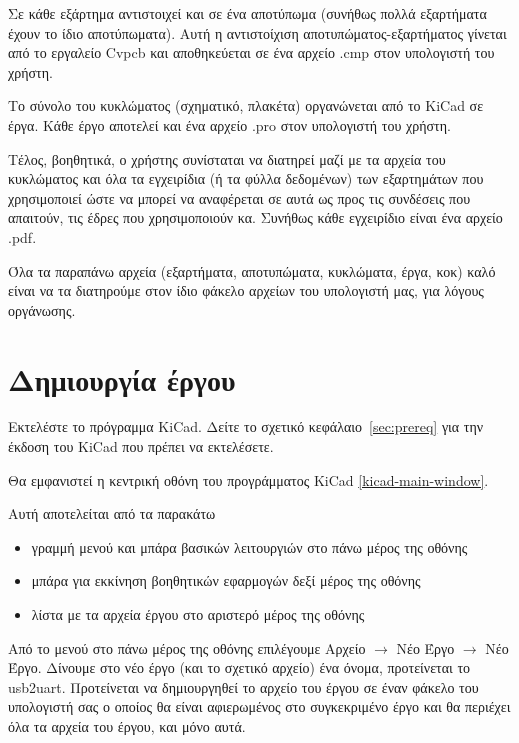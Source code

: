 \documentclass[a4paper]{article}
\begin{document}
Σε κάθε εξάρτημα αντιστοιχεί και σε ένα αποτύπωμα (συνήθως πολλά εξαρτήματα έχουν το ίδιο αποτύπωματα). Αυτή η αντιστοίχιση αποτυπώματος-εξαρτήματος γίνεται από το εργαλείο \textenglish{Cvpcb} και αποθηκεύεται σε ένα αρχείο .cmp στον υπολογιστή του χρήστη. 

Το σύνολο του κυκλώματος (σχηματικό, πλακέτα) οργανώνεται από το \textenglish{KiCad} σε έργα. Κάθε έργο αποτελεί και ένα αρχείο .pro στον υπολογιστή του χρήστη. 

Τέλος, βοηθητικά, ο χρήστης συνίσταται να διατηρεί μαζί με τα αρχεία του κυκλώματος και όλα τα εγχειρίδια (ή τα φύλλα δεδομένων) των εξαρτημάτων που χρησιμοποιεί ώστε να μπορεί να αναφέρεται σε αυτά ως προς τις συνδέσεις που απαιτούν, τις έδρες που χρησιμοποιούν κα. Συνήθως κάθε εγχειρίδιο είναι ένα αρχείο .pdf.

Όλα τα παραπάνω αρχεία (εξαρτήματα, αποτυπώματα, κυκλώματα, έργα, κοκ) καλό είναι να τα διατηρούμε στον ίδιο φάκελο αρχείων του υπολογιστή μας, για λόγους οργάνωσης.  
    
\section{Δημιουργία έργου}
Εκτελέστε το πρόγραμμα \textenglish{KiCad}. Δείτε το σχετικό κεφάλαιο~\ref{sec:prereq} για την έκδοση του \textenglish{KiCad} που πρέπει να εκτελέσετε.

Θα εμφανιστεί η κεντρική οθόνη του προγράμματος \textenglish{KiCad} \ref{kicad-main-window}. 

Αυτή αποτελείται από τα παρακάτω
\begin{itemize}
    \item γραμμή μενού και μπάρα βασικών λειτουργιών στο πάνω μέρος της οθόνης
    \item μπάρα για εκκίνηση βοηθητικών εφαρμογών δεξί μέρος της οθόνης
    \item λίστα με τα αρχεία έργου στο αριστερό μέρος της οθόνης
\end{itemize}

Από το μενού στο πάνω μέρος της οθόνης επιλέγουμε Αρχείο $\rightarrow$ Νέο Έργο $\rightarrow$ Νέο Έργο. Δίνουμε στο νέο έργο (και το σχετικό αρχείο) ένα όνομα, προτείνεται το usb2uart. Προτείνεται να δημιουργηθεί το αρχείο του έργου σε έναν φάκελο του υπολογιστή σας ο οποίος θα είναι αφιερωμένος στο συγκεκριμένο έργο και θα περιέχει όλα τα αρχεία του έργου, και μόνο αυτά.
\end{document}
